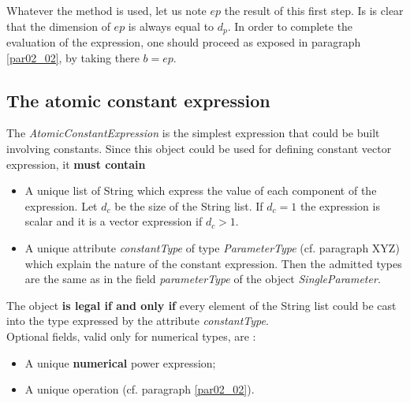 \documentclass[11pt]{amsart}
\begin{document}
Whatever the method is used, let us note $ep$ the result of this first step. Is is clear that the dimension of $ep$ 
is always equal to $d_p$. In order to complete the evaluation of the expression, one should proceed as exposed in paragraph \ref{par02_02}, by taking there $b=ep$.

\subsection{The atomic constant expression}\label{par02_03}
The {\it AtomicConstantExpression} is the simplest expression that could be built involving constants. Since this object could be used for defining constant vector expression, it {\bf must contain} 
\begin{itemize}
\item A unique list of String which express the value of each component of the expression. Let $d_c$ be the size of the String list. If $d_c=1$ the expression is scalar and it is a vector expression if $d_c>1$. 
\item A unique attribute {\it constantType} of type {\it ParameterType} (cf. paragraph XYZ) which explain the nature of the constant expression. Then the admitted types are the same as in the field {\it parameterType} of the object {\it SingleParameter}. 
\end{itemize}
The object {\bf is legal if and only if} every element of the String list could be cast into the type expressed by the attribute {\it constantType}.\\

Optional fields, valid only for numerical types, are : 
\begin{itemize}
\item A unique {\bf numerical} power expression;
\item A unique operation (cf. paragraph \ref{par02_02}).
\end{itemize}
\end{document}
